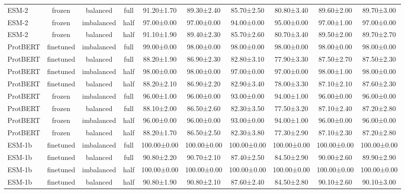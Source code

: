 \begin{tabular}{lccccccccc}
       ESM-2 &         frozen &   balanced &      full &  91.20±1.70 &  89.30±2.40 &  85.70±2.50 &  80.80±3.40 &  89.60±2.00 &  89.70±3.00 \\
       ESM-2 &         frozen & imbalanced &      half &  97.00±0.00 &  97.00±0.00 &  94.00±0.00 &  95.00±0.00 &  97.00±1.00 &  97.00±0.00 \\
       ESM-2 &         frozen &   balanced &      half &  91.10±1.90 &  89.40±2.30 &  85.70±2.60 &  80.70±3.40 &  89.50±2.00 &  89.70±2.70 \\
    ProtBERT &      finetuned & imbalanced &      full &  99.00±0.00 &  98.00±0.00 &  98.00±0.00 &  98.00±0.00 &  98.00±0.00 &  98.00±0.00 \\
    ProtBERT &      finetuned &   balanced &      full &  88.20±1.90 &  86.90±2.30 &  82.80±3.10 &  77.90±3.30 &  87.50±2.70 &  87.50±2.30 \\
    ProtBERT &      finetuned & imbalanced &      half &  98.00±0.00 &  98.00±0.00 &  97.00±0.00 &  97.00±0.00 &  98.00±1.00 &  98.00±0.00 \\
    ProtBERT &      finetuned &   balanced &      half &  88.20±2.10 &  86.90±2.20 &  82.90±3.40 &  78.00±3.30 &  87.10±2.10 &  87.60±2.30 \\
    ProtBERT &         frozen & imbalanced &      full &  96.00±1.00 &  96.00±0.00 &  93.00±0.00 &  94.00±1.00 &  96.00±0.00 &  96.00±0.00 \\
    ProtBERT &         frozen &   balanced &      full &  88.10±2.00 &  86.50±2.60 &  82.30±3.50 &  77.50±3.20 &  87.10±2.40 &  87.20±2.80 \\
    ProtBERT &         frozen & imbalanced &      half &  96.00±0.00 &  96.00±0.00 &  93.00±0.00 &  94.00±1.00 &  96.00±0.00 &  96.00±0.00 \\
    ProtBERT &         frozen &   balanced &      half &  88.20±1.70 &  86.50±2.50 &  82.30±3.80 &  77.30±2.90 &  87.10±2.30 &  87.20±2.80 \\
      ESM-1b &      finetuned & imbalanced &      full & 100.00±0.00 & 100.00±0.00 & 100.00±0.00 & 100.00±0.00 & 100.00±0.00 & 100.00±0.00 \\
      ESM-1b &      finetuned &   balanced &      full &  90.80±2.20 &  90.70±2.10 &  87.40±2.50 &  84.50±2.90 &  90.00±2.60 &  89.90±2.90 \\
      ESM-1b &      finetuned & imbalanced &      half & 100.00±0.00 & 100.00±0.00 & 100.00±0.00 & 100.00±0.00 & 100.00±0.00 & 100.00±0.00 \\
      ESM-1b &      finetuned &   balanced &      half &  90.80±1.90 &  90.80±2.10 &  87.60±2.40 &  84.50±2.80 &  90.10±2.60 &  90.10±3.00 \\

\end{tabular}
